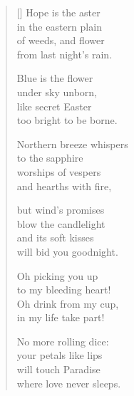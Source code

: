 \documentclass[12pt,a4paper]{article}
\begin{document}
\thispagestyle{empty}


\settowidth{\versewidth}{Northern breeze whispers}

\bigskip

\begin{verse}[\versewidth]
  Hope is the aster \\
  in the eastern plain \\
  of weeds, and flower \\
  from last night's rain.

  Blue is the flower \\
  under sky unborn, \\
  like secret Easter \\
  too bright to be borne.

  Northern breeze whispers \\
  to the sapphire \\
  worships of vespers \\
  and hearths with fire,

  but wind's promises \\
  blow the candlelight \\
  and its soft kisses \\
  will bid you goodnight.

  Oh picking you up \\
  to my bleeding heart! \\
  Oh drink from my cup, \\
  in my life take part!

  No more rolling dice: \\
  your petals like lips \\
  will touch Paradise \\
  where love never sleeps.
\end{verse}
\end{document}
